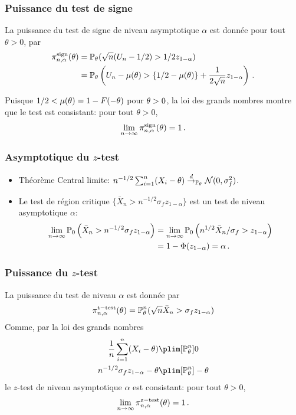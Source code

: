 \begin{frame}
\frametitle{Puissance du test de signe}
La puissance du test de signe de niveau asymptotique $\alpha$ est donnée pour tout $\theta > 0$, par
\begin{align*}
\pi^{\mathrm{sign}}_{n,\alpha}(\theta)
&= \operatorname{{\mathbb P}}_\theta( \sqrt{n}(U_n - 1/2) > 1/2 z_{1-\alpha}) \\
&= \operatorname{{\mathbb P}}_\theta\left( U_n - \mu(\theta) > \{1/2-\mu(\theta)\} + \frac{1}{2 \sqrt{n}} z_{1-\alpha}  \right) \,.
\end{align*}

Puisque $1/2 < \mu(\theta)= 1- F(-\theta)$ pour $\theta > 0$, la loi des grands nombres montre que
le test est \alert{consistant}: pour tout $\theta > 0$, \alert{
\[
\lim_{n \to \infty}  \pi^{\mathrm{sign}}_{n,\alpha}(\theta) = 1 \,.
\]
}
\end{frame}



\begin{frame}
\frametitle{Asymptotique du $z$-test}
\begin{itemize}
\item Théorème Central limite: $n^{-1/2} \sum_{i=1}^n (X_i - \theta) \stackrel{d}{\rightarrow}_{\operatorname{{\mathbb P}}_\theta} \mathcal{N}(0,\sigma^2_f)$.
\item Le test de région critique $\{ \bar{X}_n > n^{-1/2} \sigma_f z_{1-\alpha} \}$ est un test de niveau asymptotique $\alpha$:
\begin{align*}
\lim_{n \to \infty} \operatorname{{\mathbb P}}_0 \left( \bar{X}_n > n^{-1/2} \sigma_f z_{1-\alpha} \right)
&= \lim_{n \to \infty} \operatorname{{\mathbb P}}_0 \left( n^{1/2} \bar{X}_n / \sigma_f >  z_{1-\alpha} \right) \\
&= 1 - \Phi(z_{1-\alpha})= \alpha \,.
\end{align*}
\end{itemize}
\end{frame}


\begin{frame}
\frametitle{Puissance du $z$-test}
La puissance du test de niveau $\alpha$ est donnée par
\[
\pi^{\mathrm{t-test}}_{n,\alpha}(\theta)= \operatorname{{\mathbb P}}^n_{\theta}(\sqrt{n} \bar{X}_n > \sigma_f z_{1-\alpha})
\]
Comme, par la loi des grands nombres
\begin{align*}
\frac{1}{n} \sum_{i=1}^n (X_i - \theta) &\plim[\PP^n_{\theta}] 0 \\
n^{-1/2} \sigma_f z_{1-\alpha} -   \truetheta &\plim[\PP^n_{\theta}] -\truetheta
\end{align*}
le $z$-test de niveau asymptotique $\alpha$ est \alert{consistant}: pour tout $\theta > 0$, \alert{
\[
\lim_{n \to \infty} \pi^{\mathrm{z-test}}_{n,\alpha}(\theta) = 1 \,.
\]
}
\end{frame}

